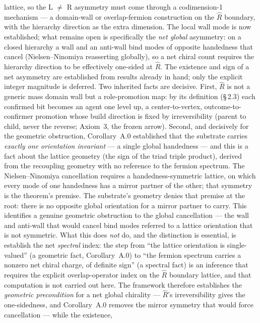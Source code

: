 \documentclass[11pt,oneside]{report}
\theoremstyle{definition}
\theoremstyle{remark}
\begin{document}
lattice, so the L \ensuremath{\neq} R asymmetry must come through a codimension-1
mechanism --- a domain-wall or overlap-fermion construction on the \ensuremath{\hat{R}}
boundary, with the hierarchy direction as the extra dimension. The local
wall mode is now established; what remains open is specifically the
\emph{net global} asymmetry: on a closed hierarchy a wall and an
anti-wall bind modes of opposite handedness that cancel
(Nielsen--Ninomiya reasserting globally), so a net chiral count requires
the hierarchy direction to be effectively one-sided at \ensuremath{\hat{R}}. The existence
and sign of a net asymmetry are established from results already in hand; only
the explicit integer magnitude is deferred. Two inherited facts are decisive.
First, \ensuremath{\hat{R}} is not a generic mass domain wall but a role-promotion map: by its
definition (\S\,2.3) each confirmed bit becomes an agent one level up, a
center-to-vertex, outcome-to-confirmer promotion whose build direction is fixed by
irreversibility (parent to child, never the reverse; Axiom~3, the frozen arrow).
Second, and decisively for the geometric obstruction, Corollary~A.0 established that
the substrate carries \emph{exactly one orientation invariant} --- a single global
handedness --- and this is a fact about the lattice geometry (the sign of the triad
triple product), derived from the recoupling geometry with no reference to the
fermion spectrum. The Nielsen--Ninomiya cancellation requires a handedness-symmetric
lattice, on which every mode of one handedness has a mirror partner of the other;
that symmetry is the theorem's premise. The substrate's geometry denies that
premise at the root: there is no opposite global orientation for a mirror partner to
carry. This identifies a genuine geometric obstruction to the global cancellation
--- the wall and anti-wall that would cancel bind modes referred to a lattice
orientation that is not symmetric. What this does \emph{not} do, and the distinction
is essential, is establish the net \emph{spectral} index: the step from ``the
lattice orientation is single-valued'' (a geometric fact, Corollary~A.0) to ``the
fermion spectrum carries a nonzero net chiral charge, of definite sign'' (a spectral
fact) is an inference that requires the explicit overlap-operator index on the
\ensuremath{\hat{R}} boundary lattice, and that computation is not carried out here. The
framework therefore establishes the \emph{geometric precondition} for a net global
chirality --- \ensuremath{\hat{R}}'s irreversibility gives the one-sidedness, and Corollary~A.0
removes the mirror symmetry that would force cancellation --- while the existence,
\end{document}
